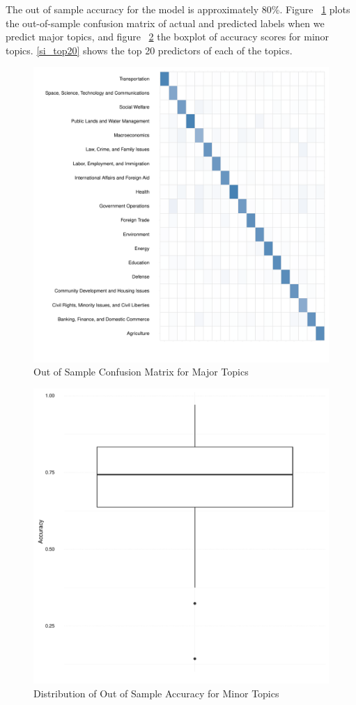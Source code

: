 \documentclass[12pt, letterpaper]{article}
\begin{document}
The out of sample accuracy for the model is approximately 80\%. Figure ~\ref{major_conf} plots the out-of-sample confusion matrix of actual and predicted labels when we predict major topics, and figure ~\ref{minor_conf} the boxplot of accuracy scores for minor topics. \ref{si_top20} shows the top 20 predictors of each of the topics.  

\begin{figure}[H]
\centering
\caption{Out of Sample Confusion Matrix for Major Topics}\label{major_conf}
\includegraphics[width=.75\textwidth]{../figs/conf_matrix_topic.pdf}
\end{figure}

\begin{figure}[H]
\centering
\caption{Distribution of Out of Sample Accuracy for Minor Topics}\label{minor_conf}
\includegraphics[width=.75\textwidth]{../figs/conf_matrix_topic_all.pdf}
\end{figure}
\end{document}
